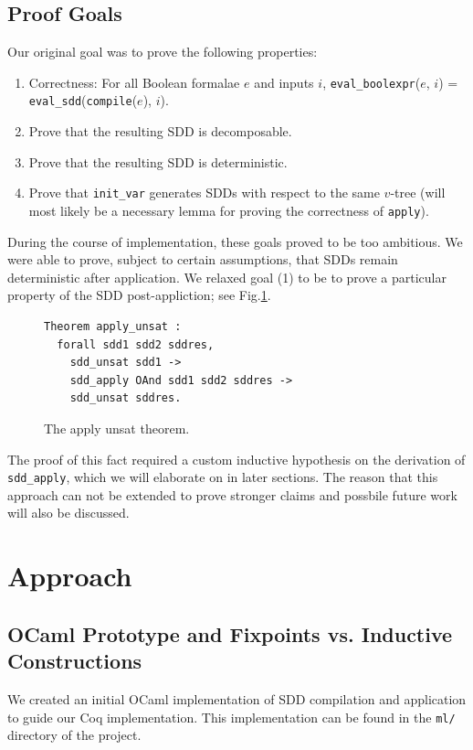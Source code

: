 \documentclass[twocolumn]{article}
\theoremstyle{definition}
\begin{document}
\subsection{Proof Goals}
Our original goal was to prove the following properties:
  \begin{enumerate}
  \item Correctness: For all Boolean formalae $e$ and inputs $i$,
    \texttt{eval\_boolexpr}($e$, $i$) =
    \texttt{eval\_sdd}(\texttt{compile}($e$),  $i$).
  \item Prove that the resulting SDD is decomposable.
  \item Prove that the resulting SDD is deterministic.
  \item Prove that \texttt{init\_var} generates SDDs with respect to the same
    $v$-tree (will most likely be a necessary lemma for proving the correctness
    of \texttt{apply}).
  \end{enumerate} 
During the course of implementation, these goals proved to be too ambitious. We
were able to prove, subject to certain assumptions, that SDDs remain
deterministic after application. We relaxed goal (1) to be to prove a particular
property of the SDD post-appliction; see Fig.\ref{fig:unsatthm}.

\begin{figure}
\begin{verbatim}
Theorem apply_unsat :
  forall sdd1 sdd2 sddres,
    sdd_unsat sdd1 ->
    sdd_apply OAnd sdd1 sdd2 sddres ->
    sdd_unsat sddres.
\end{verbatim}
  \caption{The apply unsat theorem.}
  \label{fig:unsatthm}
\end{figure}
The proof of this fact required a custom inductive hypothesis on the derivation
of \texttt{sdd\_apply}, which we will elaborate on in later sections. The reason
that this approach can not be extended to prove stronger claims and possbile
future work will also be discussed.

\section{Approach}

\subsection{OCaml Prototype and Fixpoints vs. Inductive Constructions}
We created an initial OCaml implementation of SDD compilation and application to
guide our Coq implementation. This implementation can be found in the
\texttt{ml/} directory of the project.
\end{document}

